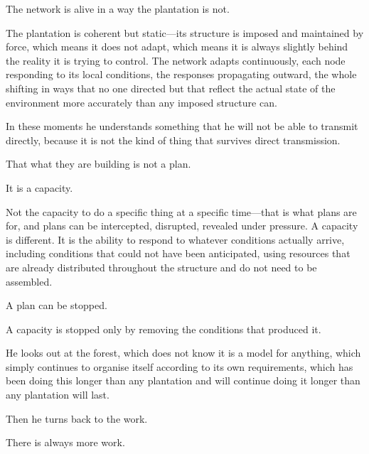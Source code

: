 The network is alive in a way the plantation is not.

The plantation is coherent but static---its structure
is imposed and maintained by force, which means it does
not adapt, which means it is always slightly behind
the reality it is trying to control. The network adapts
continuously, each node responding to its local
conditions, the responses propagating outward, the whole
shifting in ways that no one directed but that reflect
the actual state of the environment more accurately than
any imposed structure can.

In these moments he understands something that he will
not be able to transmit directly, because it is not the
kind of thing that survives direct transmission.

That what they are building is not a plan.

It is a capacity.

Not the capacity to do a specific thing at a specific
time---that is what plans are for, and plans can be
intercepted, disrupted, revealed under pressure. A
capacity is different. It is the ability to respond
to whatever conditions actually arrive, including
conditions that could not have been anticipated, using
resources that are already distributed throughout the
structure and do not need to be assembled.

A plan can be stopped.

A capacity is stopped only by removing the conditions
that produced it.

He looks out at the forest, which does not know it is
a model for anything, which simply continues to organise
itself according to its own requirements, which has been
doing this longer than any plantation and will continue
doing it longer than any plantation will last.

Then he turns back to the work.

There is always more work.

